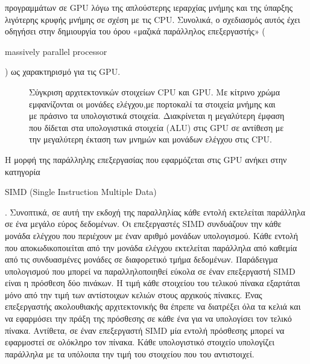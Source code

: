 προγραμμάτων σε GPU λόγω της απλούστερης ιεραρχίας μνήμης και της ύπαρξης λιγότερης κρυφής μνήμης σε σχέση με τις CPU. Συνολικά, ο σχεδιασμός αυτός έχει οδηγήσει στην δημιουργία του όρου «μαζικά παράλληλος επεξεργαστής» (\begin{english}massively parallel processor\end{english}) ως χαρακτηρισμό για τις GPU.

\begin{figure}[b!]
\captionsetup{singlelinecheck=off}
\caption[Σύγκριση αρχιτεκτονικών στοιχείων CPU και GPU.]{Σύγκριση αρχιτεκτονικών στοιχείων CPU και GPU. Με κίτρινο χρώμα εμφανίζονται οι μονάδες ελέγχου,με πορτοκαλί τα στοιχεία μνήμης και με πράσινο τα υπολογιστικά στοιχεία. Διακρίνεται η μεγαλύτερη έμφαση που δίδεται στα υπολογιστικά στοιχεία (ALU) στις GPU σε αντίθεση με την μεγαλύτερη έκταση των μνημών και μονάδων ελέγχου στις CPU.}
\label{fig6}
\end{figure}
Η μορφή της παράλληλης επεξεργασίας που εφαρμόζεται στις GPU ανήκει στην κατηγορία \begin{english}SIMD (Single Instruction Multiple Data)\end{english}. Συνοπτικά, σε αυτή την εκδοχή της παραλληλίας κάθε εντολή εκτελείται παράλληλα σε ένα μεγάλο εύρος δεδομένων. Οι επεξεργαστές SIMD συνδυάζουν την κάθε μονάδα ελέγχου που περιέχουν με έναν αριθμό μονάδων υπολογισμού. Κάθε εντολή που αποκωδικοποιείται από την μονάδα ελέγχου εκτελείται παράλληλα από καθεμία  από τις συνδυασμένες μονάδες σε διαφορετικό τμήμα δεδομένων. Παράδειγμα υπολογισμού που μπορεί να παραλληλοποιηθεί εύκολα σε έναν επεξεργαστή SIMD είναι η πρόσθεση δύο πινάκων. Η τιμή κάθε στοιχείου του τελικού πίνακα εξαρτάται μόνο από την τιμή των αντίστοιχων κελιών στους αρχικούς πίνακες. Ένας επεξεργαστής ακολουθιακής αρχιτεκτονικής θα έπρεπε να διατρέξει όλα τα κελιά και να εφαρμόσει την πράξη της πρόσθεσης σε κάθε ένα για να υπολογίσει τον τελικό πίνακα. Αντίθετα, σε έναν επεξεργαστή SIMD μία εντολή πρόσθεσης μπορεί να εφαρμοστεί σε ολόκληρο τον πίνακα.
 Κάθε υπολογιστικό στοιχείο υπολογίζει παράλληλα με τα υπόλοιπα την τιμή του στοιχείου που του αντιστοιχεί.  

